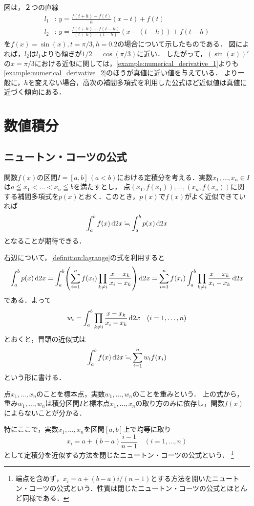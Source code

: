 \documentclass[a4paper]{ltjsarticle}
\theoremstyle{definition}
\DeclarePairedDelimiter{\pqty}{\lparen}{\rparen}
\newcommand{\dd}[1]{\dl2#1}
\begin{document}
図は，２つの直線
\begin{align*}
  l_1 &\colon\, y = \frac{f(t+h)-f(t)}{h} (x - t) + f(t) \\
  l_2 &\colon\, y = \frac{f(t+h)-f(t-h)}{(t+h)-(t-h)} (x - (t-h)) + f(t-h)
\end{align*}
を$f(x)=\sin(x), t=\pi/3, h=0.2$の場合について示したものである．
図によれば，$l_2$は$l_1$よりも傾きが$1/2 = \cos(\pi/3)$に近い．
したがって，$(\sin(x))'$の$x=\pi/3$における近似に関しては，\cref{example:numerical_derivative_1}よりも\cref{example:numerical_derivative_2}のほうが真値に近い値を与えている．
より一般に，$h$を変えない場合，高次の補間多項式を利用した公式ほど近似値は真値に近づく傾向にある．

\section{数値積分}
\subsection{ニュートン・コーツの公式}
\label{subsection:newton_cotes}
関数$f(x)$の区間$I = [a, b]\,(a<b)$における定積分を考える．実数$x_1,\dots,x_n \in I$は$a \leqq x_1 < \dots < x_n \leqq b$を満たすとし，
点$(x_1,f(x_1)),\dots,(x_n,f(x_n))$に関する補間多項式を$p(x)$とおく．このとき，$p(x)$で$f(x)$がよく近似できていれば
\[
  \int_a^b f(x) \dd{x} \fallingdotseq \int_a^b p(x) \dd{x}
\]
となることが期待できる．

右辺について，\cref{definition:lagrange}の式を利用すると
\[
  \int_a^b p(x) \dd{x}
  = \int_a^b \pqty*{\sum_{i=1}^n f(x_i) \prod_{k\neq i} \frac{x - x_k}{x_i - x_k}} \dd{x}
  = \sum_{i=1}^n f(x_i) \int_a^b \prod_{k\neq i} \frac{x - x_k}{x_i - x_k} \dd{x}
\]
である．よって
\[
  w_i = \int_a^b \prod_{k\neq i} \frac{x - x_k}{x_i - x_k} \dd{x} \quad (i=1,\dots,n)
\]
とおくと，冒頭の近似式は
\[
  \int_a^b f(x) \dd{x} \fallingdotseq \sum_{i=1}^n w_i f(x_i)
\]
という形に書ける．

点$x_1,\dots,x_n$のことを標本点，実数$w_1,\dots,w_n$のことを重みという．
上の式から，重み$w_1,\dots,w_n$は積分区間$I$と標本点$x_1,\dots,x_n$の取り方のみに依存し，関数$f(x)$によらないことが分かる．

特にここで，実数$x_1,\dots,x_n$を区間$[a,b]$上で均等に取り
\[
  x_i = a + (b-a)\frac{i-1}{n-1} \quad (i = 1,\dots,n)
\]
として定積分を近似する方法を閉じたニュートン・コーツの公式という．
\footnote{端点を含めず，$x_i = a + (b-a)i/(n+1)$とする方法を開いたニュートン・コーツの公式という．性質は閉じたニュートン・コーツの公式とほとんど同様である．}
\end{document}

